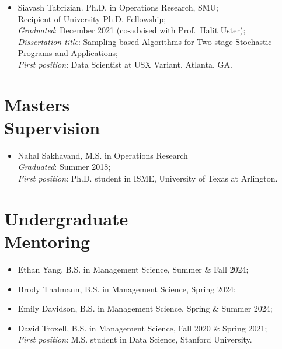 \documentclass[hyperref, margin]{myResume}
\begin{document}
\begin{resume}
\begin{itemize}[leftmargin=*]
		\item Siavash Tabrizian. Ph.D. in Operations Research, SMU;\\
		Recipient of University Ph.D. Fellowship;\\
		\emph{Graduated}: December 2021 (co-advised with Prof.\ Halit Uster);\\
		\emph{Dissertation title}: Sampling-based Algorithms for Two-stage Stochastic Programs and Applications;\\
		\emph{First position}: Data Scientist at USX Variant, Atlanta, GA.
	\end{itemize}

	\vspace{-0.2cm}
\section{Masters \\Supervision}
	\begin{itemize}[leftmargin=*]\itemsep0em
		\item Nahal Sakhavand, M.S. in Operations Research\\		
		\emph{Graduated}: Summer 2018;\\ 
		\emph{First position}: Ph.D. student in ISME, University of Texas at Arlington.
	\end{itemize}
	\vspace{-0.2cm}	
	
\section{Undergraduate \\Mentoring}
	\begin{itemize}[leftmargin=*]\itemsep0em
		\item Ethan Yang, B.S. in Management Science, Summer \& Fall 2024;			
		\item Brody Thalmann, B.S. in Management Science, Spring 2024;	
		\item Emily Davidson, B.S. in Management Science, Spring \& Summer 2024;
		\item David Troxell, B.S. in Management Science, Fall 2020 \& Spring 2021;\\
		\emph{First position}: M.S. student in Data Science, Stanford University.	
	\end{itemize}


\end{resume}
\end{document}
